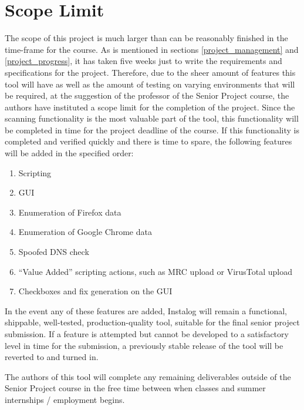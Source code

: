 \documentclass[letterpaper,12pt]{article}
\begin{document}
\section{Scope Limit} \label{scope_limit}
The scope of this project is much larger than can be reasonably finished in the
time-frame for the course.  As is mentioned in sections 
\ref{project_management} and \ref{project_progress}, it has taken five weeks
just to write the requirements and specifications for the project.  Therefore,
due to the sheer amount of features this tool will have as well as the amount of
testing on varying environments that will be required, at the suggestion of the
professor of the Senior Project course, the authors have instituted a scope
limit for the completion of the project.  Since the scanning functionality is
the most valuable part of the tool, this functionality will be completed in time
for the project deadline of the course.  If this functionality is completed and
verified quickly and there is time to spare, the following features will be
added in the specified order:

\begin{enumerate}
    \item Scripting 
    \item GUI 
    \item Enumeration of Firefox data
    \item Enumeration of Google Chrome data
    \item Spoofed DNS check
    \item ``Value Added'' scripting actions, such as MRC upload or VirusTotal
    upload
    \item Checkboxes and fix generation on the GUI
\end{enumerate}

In the event any of these features are added, Instalog will remain a functional,
shippable, well-tested, production-quality tool, suitable for the final senior
project submission.  If a feature is attempted but cannot be developed to a
satisfactory level in time for the submission, a previously stable release of
the tool will be reverted to and turned in.  

The authors of this tool will complete any remaining deliverables outside of the
Senior Project course in the free time between when classes and summer
internships / employment begins.  

\newpage
\end{document}
